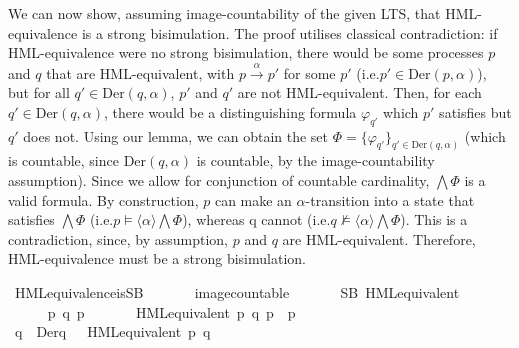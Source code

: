 \begin{isabellebody}
{\isafoldvisible}%
%
\isadelimvisible
%
\endisadelimvisible
%
\begin{isamarkuptext}%
We can now show, assuming image-countability of the given LTS, that HML-equivalence is a strong bisimulation. The proof utilises classical contradiction: 
if HML-equivalence were no strong bisimulation, there would be some processes $p$ and $q$ that are HML-equivalent, with $p \xrightarrow{\alpha} p'$ for some $p'$ (i.e.\@ $p' \in \text{Der}(p, \alpha)$), but for all $q' \in \text{Der}(q, \alpha)$, $p'$ and $q'$ are not HML-equivalent. 
Then, for each $q' \in \text{Der}(q, \alpha)$, there would be a distinguishing formula $\varphi_{q'}$ which $p'$ satisfies but $q'$ does not. 
Using our  lemma, we can obtain the set 
$\Phi = \{ \varphi_{q'} \}_{q' \in \text{Der}(q, \alpha)}$
(which is countable, since $\text{Der}(q, \alpha)$ is countable, by the image-countability assumption).
Since we allow for conjunction of countable cardinality, $\bigwedge \Phi$ is a valid formula. 
By construction, $p$ can make an $\alpha$-transition into a state that satisfies $\bigwedge \Phi$ 
(i.e.\@ $p \vDash \langle\alpha\rangle \bigwedge \Phi$), whereas q cannot 
(i.e.\@ $q \not\vDash \langle\alpha\rangle \bigwedge \Phi$).
This is a contradiction, since, by assumption, $p$ and $q$ are HML-equivalent. 
Therefore, HML-equivalence must be a strong bisimulation.%
\end{isamarkuptext}\isamarkuptrue%
%
\isadelimvisible
%
\endisadelimvisible
%
\isatagvisible
{}\isamarkupfalse%
\ HML{\isacharunderscore}{\kern0pt}equivalence{\isacharunderscore}{\kern0pt}is{\isacharunderscore}{\kern0pt}SB{\isacharcolon}{\kern0pt}\isanewline
\ \ \isanewline
\ \ \ \ {\isacartoucheopen}image{\isacharunderscore}{\kern0pt}countable{\isacartoucheclose}\isanewline
\ \ \isanewline
\ \ \ \ {\isacartoucheopen}SB\ HML{\isacharunderscore}{\kern0pt}equivalent{\isacartoucheclose}\isanewline
{}\isamarkupfalse%
\ {\isacharminus}{\kern0pt}\isanewline
\ \ \isacommand{{\isacharbraceleft}{\kern0pt}}\isamarkupfalse%
\isanewline
\ \ \ \ \isamarkupfalse%
\ p\ q\ p{\isacharprime}{\kern0pt}\ {\isasymalpha}\isanewline
\ \ \ \ \isamarkupfalse%
\ {\isacartoucheopen}HML{\isacharunderscore}{\kern0pt}equivalent\ p\ q{\isacartoucheclose}\ {\isacartoucheopen}p\ {\isasymlongmapsto}{\isasymalpha}\ p{\isacharprime}{\kern0pt}{\isacartoucheclose}\isanewline
\ \ \ \ \isamarkupfalse%
\ {\isacartoucheopen}{\isasymforall}q{\isacharprime}{\kern0pt}\ {\isasymin}\ Der{\isacharparenleft}{\kern0pt}q{\isacharcomma}{\kern0pt}\ {\isasymalpha}{\isacharparenright}{\kern0pt}{\isachardot}{\kern0pt}\ {\isasymnot}\ HML{\isacharunderscore}{\kern0pt}equivalent\ p{\isacharprime}{\kern0pt}\ q{\isacharprime}{\kern0pt}{\isacartoucheclose}\isanewline

\end{isabellebody}
